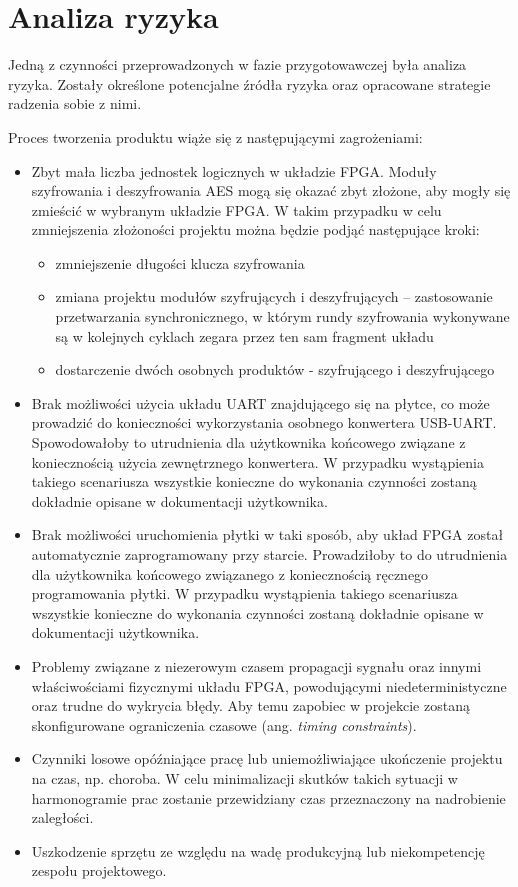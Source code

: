 \section{Analiza ryzyka}
\label{sec:analiza-ryzyka}
Jedną z czynności przeprowadzonych w fazie przygotowawczej była analiza ryzyka. Zostały określone potencjalne źródła ryzyka oraz opracowane strategie radzenia sobie z nimi.

Proces tworzenia produktu wiąże się z następującymi zagrożeniami:
\begin{itemize}

\item Zbyt mała liczba jednostek logicznych w układzie FPGA. Moduły szyfrowania i deszyfrowania AES mogą się okazać zbyt złożone, aby mogły się zmieścić w wybranym układzie FPGA. W takim przypadku w celu zmniejszenia złożoności projektu można będzie podjąć następujące kroki:
	\begin{itemize}
	\item zmniejszenie długości klucza szyfrowania
	\item zmiana projektu modułów szyfrujących i deszyfrujących -- zastosowanie przetwarzania synchronicznego, w którym rundy szyfrowania wykonywane są w kolejnych cyklach zegara przez ten sam fragment układu
	\item dostarczenie dwóch osobnych produktów - szyfrującego i deszyfrującego
	\end{itemize}
\item Brak możliwości użycia układu UART znajdującego się na płytce, co może prowadzić do konieczności wykorzystania osobnego konwertera USB-UART. Spowodowałoby to utrudnienia dla użytkownika końcowego związane z koniecznością użycia zewnętrznego konwertera. W przypadku wystąpienia takiego scenariusza wszystkie konieczne do wykonania czynności zostaną dokładnie opisane w dokumentacji użytkownika.
\item Brak możliwości uruchomienia płytki w taki sposób, aby układ FPGA został automatycznie zaprogramowany przy starcie. Prowadziłoby to do utrudnienia dla użytkownika końcowego związanego z koniecznością ręcznego programowania płytki. W przypadku wystąpienia takiego scenariusza wszystkie konieczne do wykonania czynności zostaną dokładnie opisane w dokumentacji użytkownika.
\item Problemy związane z niezerowym czasem propagacji sygnału oraz innymi właściwościami fizycznymi układu FPGA, powodującymi niedeterministyczne oraz trudne do wykrycia błędy. Aby temu zapobiec w projekcie zostaną skonfigurowane ograniczenia czasowe (ang. \textit{timing constraints}).
\item Czynniki losowe opóźniające pracę lub uniemożliwiające ukończenie projektu na czas, np. choroba. W celu minimalizacji skutków takich sytuacji w harmonogramie prac zostanie przewidziany czas przeznaczony na nadrobienie zaległości.
\item Uszkodzenie sprzętu ze względu na wadę produkcyjną lub niekompetencję zespołu projektowego.
\end{itemize}



\newpage